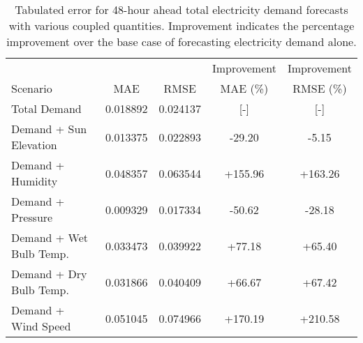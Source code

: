   \begin{table*}[t]
    \centering
    \caption{Tabulated error for 48-hour ahead total electricity demand forecasts with various coupled quantities. Improvement indicates the percentage improvement over the base case of forecasting electricity demand alone.}
    \label{tab:demand48}
    \begin{tabular}{l|c|c|c|c}
      &  & & Improvement & Improvement \\
      Scenario  & MAE & RMSE & MAE (\%) & RMSE (\%)\\
      \hline
      Total Demand & 0.018892 & 0.024137 & [-] & [-] \\
      Demand + Sun Elevation & 0.013375 & 0.022893 & -29.20& -5.15 \\
      Demand + Humidity & 0.048357 & 0.063544 & +155.96 & +163.26 \\
      Demand + Pressure & 0.009329 & 0.017334 & -50.62 & -28.18\\
      Demand + Wet Bulb Temp. & 0.033473 & 0.039922 & +77.18 & +65.40\\
      Demand + Dry Bulb Temp. & 0.031866 & 0.040409 & +66.67 & +67.42\\
      Demand + Wind Speed & 0.051045 & 0.074966 & +170.19 & +210.58\\
    \end{tabular}
  \end{table*}
